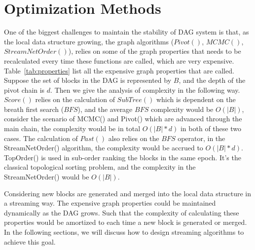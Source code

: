 \section{Optimization Methods}
One of the biggest challenges to maintain the stability of DAG system is that, 
as the local data structure growing, the graph algorithms ($Pivot()$, $MCMC()$, $StreamNetOrder()$), 
relies on some of the graph properties that needs to be recalculated every time these functions are called,
which are very expensive. 
Table~\ref{tab:properties} list all the expensive graph properties that are called. 
Suppose the set of blocks in the DAG is represented by $B$, and the depth of the pivot chain is $d$.
Then we give the analysis of complexity in the following way. 
$Score()$ relies on the calculation of $SubTree()$ which is dependent on the breath first search ($BFS$), and the average $BFS$
complexity would be $O(|B|)$, consider the scenario of MCMC() and Pivot() which are advanced through the main chain,
the complexity would be in total $O(|B|*d)$ in both of these two cases.
The calculation of $Past()$ also relies on the $BFS$ operator, in the StreamNetOrder() algorithm, the complexity would be 
accrued to $O(|B| * d)$.
TopOrder() is used in sub-order ranking the blocks in the same epoch.
It's the classical topological sorting problem, and the complexity in the StreamNetOrder() would be $O(|B|)$.

\begin{table}[]
\caption {Analysis of Graph properties calculation} \label{tab:properties}
\begin{center}
\end{center}
\end{table}

Considering new blocks are generated and merged into the local data structure in a streaming way.
The expensive graph properties could be maintained dynamically as the DAG grows.
Such that the complexity of calculating these properties would be amortized to each time a new block is generated or merged.
In the following sections, we will discuss how to design streaming algorithms to achieve this goal.

